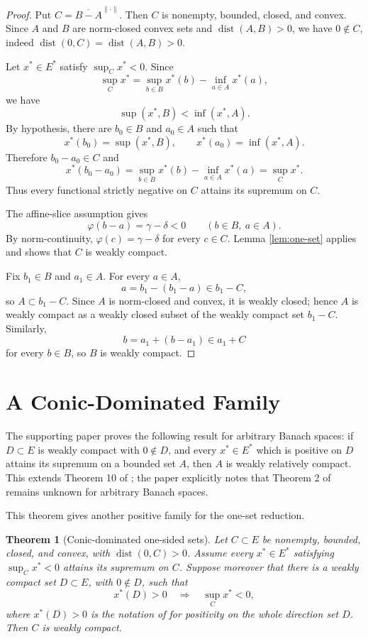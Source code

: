 \documentclass[11pt]{article}
\newtheorem{theorem}{Theorem}
\newcommand{\dist}{\operatorname{dist}}
\begin{document}
\begin{proof}
Put \(C=\overline{B-A}^{\|\cdot\|}\). Then \(C\) is nonempty, bounded,
closed, and convex. Since \(A\) and \(B\) are norm-closed convex sets and
\(\dist(A,B)>0\), we have \(0\notin C\), indeed
\(\dist(0,C)=\dist(A,B)>0\).

Let \(x^\ast\in E^\ast\) satisfy \(\sup_C x^\ast<0\). Since
\[
  \sup_C x^\ast
  =
  \sup_{b\in B}x^\ast(b)-\inf_{a\in A}x^\ast(a),
\]
we have
\[
  \sup(x^\ast,B)<\inf(x^\ast,A).
\]
By hypothesis, there are \(b_0\in B\) and \(a_0\in A\) such that
\[
  x^\ast(b_0)=\sup(x^\ast,B),\qquad
  x^\ast(a_0)=\inf(x^\ast,A).
\]
Therefore \(b_0-a_0\in C\) and
\[
  x^\ast(b_0-a_0)
  =
  \sup_{b\in B}x^\ast(b)-\inf_{a\in A}x^\ast(a)
  =
  \sup_C x^\ast.
\]
Thus every functional strictly negative on \(C\) attains its supremum on
\(C\).

The affine-slice assumption gives
\[
  \varphi(b-a)=\gamma-\delta<0
  \qquad (b\in B,\ a\in A).
\]
By norm-continuity, \(\varphi(c)=\gamma-\delta\) for every \(c\in C\).
Lemma \ref{lem:one-set} applies and shows that \(C\) is weakly compact.

Fix \(b_1\in B\) and \(a_1\in A\). For every \(a\in A\),
\[
  a=b_1-(b_1-a)\in b_1-C,
\]
so \(A\subset b_1-C\). Since \(A\) is norm-closed and convex, it is
weakly closed; hence \(A\) is weakly compact as a weakly closed subset of
the weakly compact set \(b_1-C\). Similarly,
\[
  b=a_1+(b-a_1)\in a_1+C
\]
for every \(b\in B\), so \(B\) is weakly compact.
\end{proof}

\section*{A Conic-Dominated Family}

The supporting paper \cite{Orihuela2016} proves the following result for
arbitrary Banach spaces: if \(D\subset E\) is weakly compact with
\(0\notin D\), and every \(x^\ast\in E^\ast\) which is positive on \(D\)
attains its supremum on a bounded set \(A\), then \(A\) is weakly
relatively compact. This extends Theorem 10 of \cite{COP2015}; the paper
explicitly notes that Theorem 2 of \cite{COP2015} remains unknown for
arbitrary Banach spaces.

This theorem gives another positive family for the one-set reduction.

\begin{theorem}[Conic-dominated one-sided sets]
\label{thm:conic-dominated}
Let \(C\subset E\) be nonempty, bounded, closed, and convex, with
\(\dist(0,C)>0\). Assume every \(x^\ast\in E^\ast\) satisfying
\(\sup_C x^\ast<0\) attains its supremum on \(C\). Suppose moreover that
there is a weakly compact set \(D\subset E\), with \(0\notin D\), such
that
\[
  x^\ast(D)>0 \quad\Longrightarrow\quad \sup_C x^\ast<0,
\]
where \(x^\ast(D)>0\) is the notation of \cite{Orihuela2016} for
positivity on the whole direction set \(D\). Then \(C\) is weakly
compact.
\end{theorem}
\end{document}
